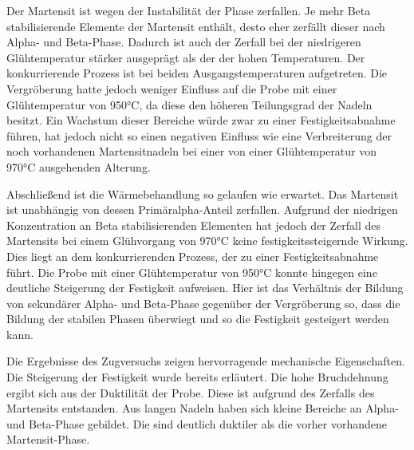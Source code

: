 \documentclass[a4paper, 11pt]{tubsreprt}
\begin{document}
Der Martensit ist wegen der Instabilität der Phase zerfallen. Je mehr Beta stabilisierende Elemente der Martensit enthält, desto eher zerfällt dieser nach Alpha- und Beta-Phase. Dadurch ist auch der Zerfall bei der niedrigeren Glühtemperatur stärker ausgeprägt als der der hohen Temperaturen. Der konkurrierende Prozess ist bei beiden Ausgangstemperaturen aufgetreten. Die Vergröberung hatte jedoch weniger Einfluss auf die Probe mit einer Glühtemperatur von 950°C, da diese den höheren Teilungsgrad der Nadeln besitzt. Ein Wachstum dieser Bereiche würde zwar zu einer Festigkeitsabnahme führen, hat jedoch nicht so einen negativen Einfluss wie eine Verbreiterung der noch vorhandenen Martensitnadeln bei einer von einer Glühtemperatur von 970°C ausgehenden Alterung.

Abschließend ist die Wärmebehandlung so gelaufen wie erwartet. Das Martensit ist unabhängig von dessen Primäralpha-Anteil zerfallen. Aufgrund der niedrigen Konzentration an Beta stabilisierenden Elementen hat jedoch der Zerfall des Martensits bei einem Glühvorgang von 970°C keine festigkeitssteigernde Wirkung. Dies liegt an dem konkurrierenden Prozess, der zu einer Festigkeitsabnahme führt. Die Probe mit einer Glühtemperatur von 950°C konnte hingegen eine deutliche Steigerung der Festigkeit aufweisen. Hier ist das Verhältnis der Bildung von sekundärer Alpha- und Beta-Phase gegenüber der Vergröberung so, dass die Bildung der stabilen Phasen überwiegt und so die Festigkeit gesteigert werden kann.

Die Ergebnisse des Zugversuchs zeigen hervorragende mechanische Eigenschaften. Die Steigerung der Festigkeit wurde bereits erläutert. Die hohe Bruchdehnung ergibt sich aus der Duktilität der Probe. Diese ist aufgrund des Zerfalls des Martensits entstanden. Aus langen Nadeln haben sich kleine Bereiche an Alpha- und Beta-Phase gebildet. Die sind deutlich duktiler als die vorher vorhandene Martensit-Phase.


\listoffigures
\listoftables
\end{document}
